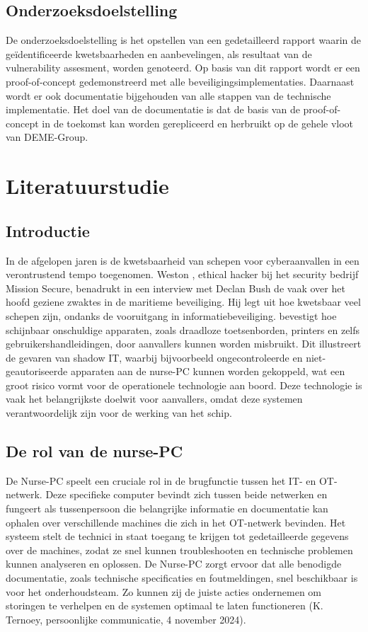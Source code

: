 \subsection{Onderzoeksdoelstelling}
De onderzoeksdoelstelling is het opstellen van een gedetailleerd rapport waarin de geïdentificeerde kwetsbaarheden en aanbevelingen, als resultaat van de vulnerability assesment, worden genoteerd.
Op basis van dit rapport wordt er een proof-of-concept gedemonstreerd met alle beveiligingsimplementaties.
Daarnaast wordt er ook documentatie bijgehouden van alle stappen van de technische implementatie.
Het doel van de documentatie is dat de basis van de proof-of-concept in de toekomst kan worden gerepliceerd en herbruikt op de gehele vloot van DEME-Group.



\section{Literatuurstudie}%
\label{sec:literatuurstudie}
\subsection{Introductie}
In de afgelopen jaren is de kwetsbaarheid van schepen voor cyberaanvallen in een verontrustend tempo toegenomen. Weston \textcite{Hecker2021}, ethical hacker bij het security bedrijf 
Mission Secure, benadrukt in een interview met Declan Bush de vaak over het hoofd geziene zwaktes in de maritieme beveiliging. Hij
legt uit hoe kwetsbaar veel schepen zijn, ondanks de vooruitgang in informatiebeveiliging. \textcite{Hecker2021} bevestigt hoe schijnbaar onschuldige apparaten, zoals draadloze toetsenborden, printers en 
zelfs gebruikershandleidingen, door aanvallers kunnen worden misbruikt. Dit illustreert de gevaren van shadow IT, waarbij bijvoorbeeld 
ongecontroleerde en niet-geautoriseerde apparaten aan de nurse-PC kunnen worden gekoppeld, wat een groot risico vormt voor de operationele technologie aan boord. 
Deze technologie is vaak het belangrijkste doelwit voor aanvallers, omdat deze systemen verantwoordelijk zijn voor de werking van het schip.

\subsection{De rol van de nurse-PC}
De Nurse-PC speelt een cruciale rol in de brugfunctie tussen het IT- en OT-netwerk. Deze specifieke computer bevindt 
zich tussen beide netwerken en fungeert als tussenpersoon die belangrijke informatie en documentatie kan ophalen over verschillende machines 
die zich in het OT-netwerk bevinden. Het systeem stelt de technici in staat toegang te krijgen tot gedetailleerde gegevens over de 
machines, zodat ze snel kunnen troubleshooten en technische problemen kunnen analyseren en oplossen. De Nurse-PC zorgt ervoor dat alle benodigde documentatie, 
zoals technische specificaties en foutmeldingen, snel beschikbaar is voor het onderhoudsteam. Zo kunnen zij de juiste acties ondernemen om storingen 
te verhelpen en de systemen optimaal te laten functioneren (K. Ternoey, persoonlijke communicatie, 4 november 2024).

